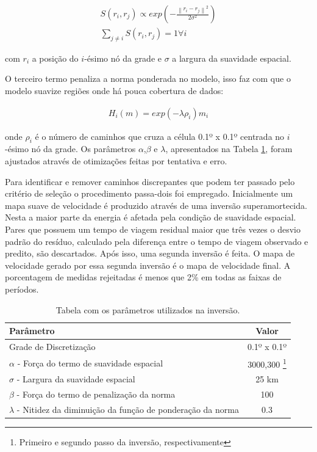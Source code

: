 \begin{eqnarray}
S(r_{i},r_{j}) \propto exp(- \frac{\left \| r_{i}-r_{j}  \right \|^{2}}{2\sigma ^{2}}) \\
\sum_{j\neq i} S(r_{i},r_{j}) = 1         \forall i 
\end{eqnarray}

com $r_{i}$ a posição do $i$-ésimo nó da grade e $\sigma$ a largura da suavidade espacial.

O terceiro termo penaliza a norma ponderada no modelo, isso faz com que o modelo suavize regiões onde há pouca cobertura de dados:

\begin{eqnarray}
H_{i}(m) = exp(-\lambda \rho _{i})m_{i}
\end{eqnarray}

onde $\rho _{i}$ é o número de caminhos que cruza a célula 0.1º x 0.1º centrada no $i$-ésimo nó da grade. Os parâmetros $\alpha$,$\beta$ e $\lambda$, apresentados na Tabela \ref{tabelaPARAMETROS}, foram ajustados através de otimizações feitas por tentativa e erro.

Para identificar e remover caminhos discrepantes que podem ter passado pelo critério de seleção o procedimento passa-dois foi empregado. Inicialmente um mapa suave de velocidade é produzido através de uma inversão superamortecida. Nesta a maior parte da energia é afetada pela condição de suavidade espacial. Pares que possuem um tempo de viagem residual maior que três vezes o desvio padrão do resíduo, calculado pela diferença entre o tempo de viagem observado e predito,  são descartados. Após isso, uma segunda inversão é feita. O mapa de velocidade gerado por essa segunda inversão é o mapa de velocidade final. A porcentagem de medidas rejeitadas é menos que 2\% em todas as faixas de períodos.

\begin{savenotes}
\begin{table}[!ht]
\begin{center}
\small
\caption{Tabela com os parâmetros utilizados na inversão.}
\begin{tabular}{ l c }
\hline
{\textbf{Parâmetro}} & {\textbf{Valor}}\\
\hline
Grade de Discretização & 0.1º x 0.1º\\
$\alpha$ - Força do termo de suavidade espacial & 3000,300 \footnote{Primeiro e segundo passo da inversão, respectivamente}
\\
$\sigma$ - Largura da suavidade espacial & 25 km\\
$\beta$ - Força do termo de penalização da norma & 100\\
$\lambda$ - Nitidez da diminuição da função de ponderação da norma & 0.3\\
\hline
\end{tabular}
\label{tabelaPARAMETROS}
\end{center}
\end{table}
\end{savenotes}

